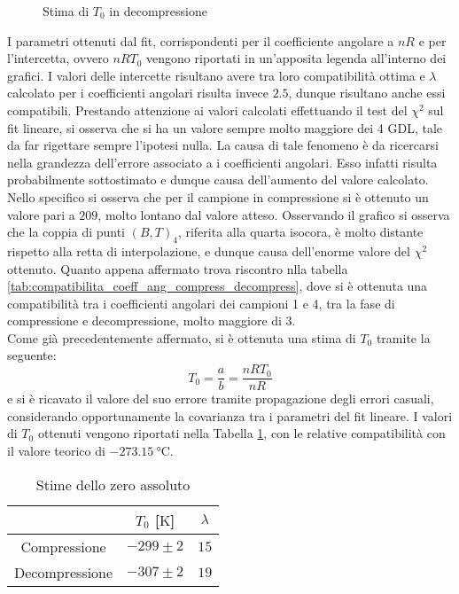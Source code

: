 \documentclass[a4paper,11pt,oneside]{article}
\begin{document}
\begin{figure}[h!]
    \centering
    \caption{Stima di $T_0$ in decompressione}
    \label{fig:t0_decompressione}
\end{figure}
I parametri ottenuti dal fit, corrispondenti per il coefficiente angolare a $n R$ e per l'intercetta, ovvero $n R T_0$  vengono riportati in un'apposita legenda all'interno dei grafici. I valori delle intercette risultano avere tra loro compatibilità ottima e $\lambda$ calcolato per i coefficienti angolari risulta invece $2.5$, dunque risultano anche essi compatibili. Prestando attenzione ai valori calcolati effettuando il test del $\chi^2$ sul fit lineare, si osserva che si ha un valore sempre molto maggiore dei 4 GDL, tale da far rigettare sempre l'ipotesi nulla. La causa di tale fenomeno è da ricercarsi nella grandezza dell'errore associato a i coefficienti angolari. Esso infatti risulta probabilmente sottostimato e dunque causa dell'aumento del valore calcolato.  Nello specifico si osserva che per il campione in compressione si è ottenuto un valore pari a $209$, molto lontano dal valore atteso.
Osservando il grafico si osserva che la coppia di punti $(B,T)_4$, riferita alla quarta isocora, è molto distante rispetto alla retta di interpolazione, e dunque causa dell'enorme valore del $\chi^2$ ottenuto. Quanto appena affermato trova riscontro nlla tabella \ref{tab:compatibilita_coeff_ang_compress_decompress}, dove si è ottenuta una compatibilità tra i coefficienti angolari dei campioni 1 e 4, tra la fase di compressione e decompressione, molto maggiore di $3$.\\
Come già precedentemente affermato, si è ottenuta una stima di $T_0$ tramite la seguente:
\begin{equation*}
    T_0=\frac{a}{b}=\frac{n R  T_0} {n R}
\end{equation*}
e si è ricavato il valore del suo errore tramite propagazione degli errori casuali, considerando opportunamente la covarianza tra i parametri del fit lineare.
I valori di $T_0$ ottenuti vengono riportati nella Tabella \ref{tab:zero_ass}, con le relative compatibilità con il valore teorico di $\SI{-273.15}{\celsius}$.

\begin{table}[h!]
    \centering
    \begin{tabular}{|c|c|c|}
        \hline
        & $T_{0}$ [$\si{\kelvin}$] & $\lambda$\\ \hline
        \rowcolor[rgb]{0.85,0.85,0.85}Compressione & $-299\pm2$ & $15$\\ \hline
        Decompressione & $-307\pm2$ & $19$\\ \hline
    \end{tabular}
    \caption{Stime dello zero assoluto}
    \label{tab:zero_ass}
\end{table}
\end{document}
